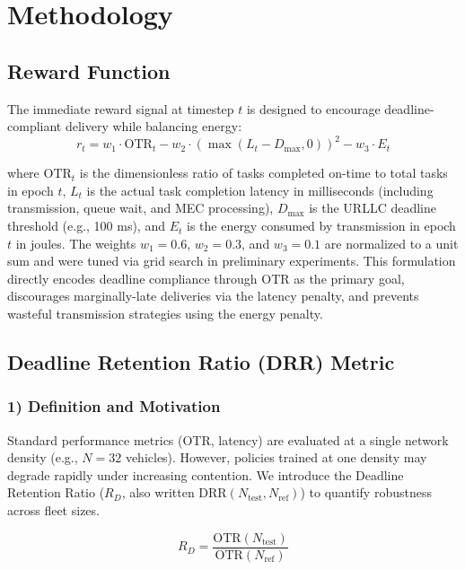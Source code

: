 \documentclass[journal,10pt,twocolumn]{IEEEtran}
\begin{document}
\section{Methodology}
\subsection{Reward Function}

The immediate reward signal at timestep $t$ is designed to encourage deadline-compliant delivery while balancing energy:
\begin{equation}
\label{eq:reward_function}
r_t = w_1 \cdot \text{OTR}_t - w_2 \cdot (\max(L_t - D_{\max}, 0))^2 - w_3 \cdot E_t
\end{equation}

where $\text{OTR}_t$ is the dimensionless ratio of tasks completed on-time to total tasks in epoch $t$, $L_t$ is the actual task completion latency in milliseconds (including transmission, queue wait, and MEC processing), $D_{\max}$ is the URLLC deadline threshold (e.g., 100 ms), and $E_t$ is the energy consumed by transmission in epoch $t$ in joules. The weights $w_1 = 0.6$, $w_2 = 0.3$, and $w_3 = 0.1$ are normalized to a unit sum and were tuned via grid search in preliminary experiments. This formulation directly encodes deadline compliance through OTR as the primary goal, discourages marginally-late deliveries via the latency penalty, and prevents wasteful transmission strategies using the energy penalty.

\subsection{Deadline Retention Ratio (DRR) Metric}

\subsubsection*{1) Definition and Motivation}

Standard performance metrics (OTR, latency) are evaluated at a single network density (e.g., $N = 32$ vehicles). However, policies trained at one density may degrade rapidly under increasing contention. We introduce the Deadline Retention Ratio ($R_D$, also written $\text{DRR}(N_{\text{test}}, N_{\text{ref}})$) to quantify robustness across fleet sizes.

\begin{equation}
\label{eq:drr_definition}
R_D = \frac{\text{OTR}(N_{\text{test}})}{\text{OTR}(N_{\text{ref}})}
\end{equation}
\end{document}
